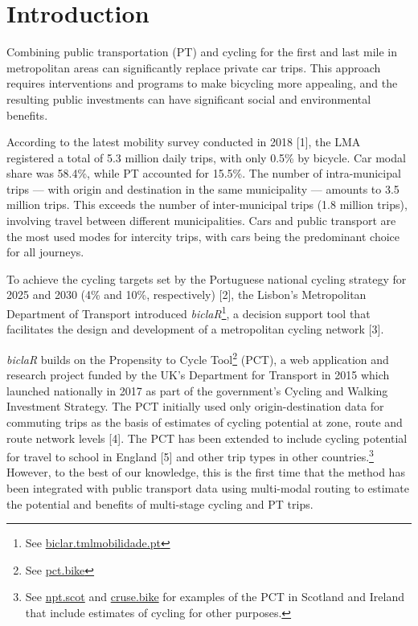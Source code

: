 \documentclass[runningheads]{llncs}
\begin{document}
\hypertarget{introduction}{%
\section{Introduction}\label{introduction}}

Combining public transportation (PT) and cycling for the first and last
mile in metropolitan areas can significantly replace private car trips.
This approach requires interventions and programs to make bicycling more
appealing, and the resulting public investments can have significant
social and environmental benefits.

According to the latest mobility survey conducted in 2018 {[}1{]}, the
LMA registered a total of 5.3 million daily trips, with only 0.5\% by
bicycle. Car modal share was 58.4\%, while PT accounted for 15.5\%. The
number of intra-municipal trips --- with origin and destination in the
same municipality --- amounts to 3.5 million trips. This exceeds the
number of inter-municipal trips (1.8 million trips), involving travel
between different municipalities. Cars and public transport are the most
used modes for intercity trips, with cars being the predominant choice
for all journeys.

To achieve the cycling targets set by the Portuguese national cycling
strategy for 2025 and 2030 (4\% and 10\%, respectively) {[}2{]}, the
Lisbon's Metropolitan Department of Transport introduced
\emph{biclaR}\footnote{See
  \href{https://biclar.tmlmobilidade.pt/}{biclar.tmlmobilidade.pt}}, a
decision support tool that facilitates the design and development of a
metropolitan cycling network {[}3{]}.

\emph{biclaR} builds on the Propensity to Cycle Tool\footnote{See
  \href{https://www.pct.bike/}{pct.bike}} (PCT), a web application and
research project funded by the UK's Department for Transport in 2015
which launched nationally in 2017 as part of the government's Cycling
and Walking Investment Strategy. The PCT initially used only
origin-destination data for commuting trips as the basis of estimates of
cycling potential at zone, route and route network levels {[}4{]}. The
PCT has been extended to include cycling potential for travel to school
in England {[}5{]} and other trip types in other countries.\footnote{See
  \href{https://www.npt.scot}{npt.scot} and
  \href{https://cruse.bike}{cruse.bike} for examples of the PCT in
  Scotland and Ireland that include estimates of cycling for other
  purposes.} However, to the best of our knowledge, this is the first
time that the method has been integrated with public transport data
using multi-modal routing to estimate the potential and benefits of
multi-stage cycling and PT trips.
\end{document}
